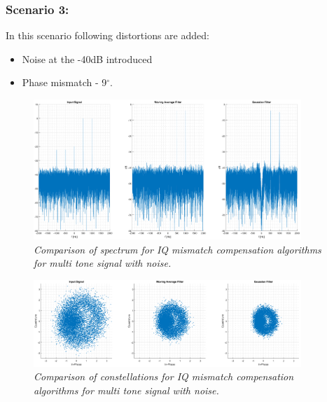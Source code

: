 \documentclass[en,printmode]{mgr}
\begin{document}
   		\subsubsection*{Scenario 3: }
			In this scenario following distortions are added:
			\begin{itemize}
				\item Noise at the -40dB introduced
				\item Phase mismatch - 9$^\circ$.
			\end{itemize}
				\begin{figure}[H]
    			\centering
   				\includegraphics[width=0.9\textwidth]{plots/multi_nf2.png}
   		 		\caption{\textit{Comparison of spectrum for IQ mismatch compensation algorithms for 
   		 		multi tone signal with noise.}}
   		 	\end{figure}
   		 	\begin{figure}[H]
    			\centering
   				\includegraphics[width=0.9\textwidth]{plots/multi_nc2.png}
   		 		\caption{\textit{Comparison of constellations for IQ mismatch compensation algorithms 
   		 		for multi tone signal with noise.}}
   		 	\end{figure}
\end{document}
